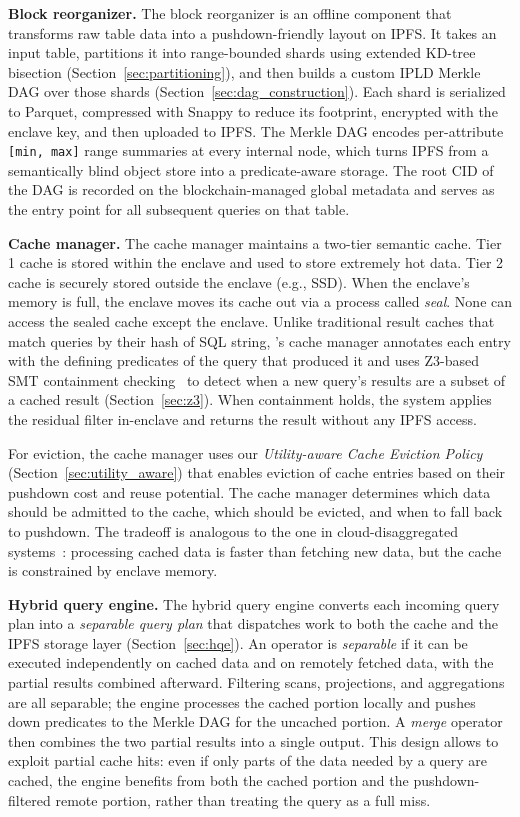 \textbf{Block reorganizer.}
The block reorganizer is an offline component that transforms raw table data into a pushdown-friendly layout on IPFS. It takes an input table, partitions it into range-bounded shards using extended KD-tree bisection (Section~\ref{sec:partitioning}), and then builds a custom IPLD Merkle DAG over those shards (Section~\ref{sec:dag_construction}). Each shard is serialized to Parquet, compressed with Snappy to reduce its footprint, encrypted with the enclave key, and then uploaded to IPFS. The Merkle DAG encodes per-attribute \texttt{[min, max]} range summaries at every internal node, which turns IPFS from a semantically blind object store into a predicate-aware storage. The root CID of the DAG is recorded on the blockchain-managed global metadata and serves as the entry point for all subsequent queries on that table.
 
\textbf{Cache manager.}
The cache manager maintains a two-tier semantic cache. Tier 1 cache is stored within the enclave and used to store extremely hot data. Tier 2 cache is securely stored outside the enclave (e.g., SSD). When the enclave's memory is full, the enclave moves its cache out via a process called \textit{seal}. None can access the sealed cache except the enclave. Unlike traditional result caches that match queries by their hash of SQL string, \ours{}'s cache manager annotates each entry with the defining predicates of the query that produced it and uses Z3-based SMT containment checking~\cite{de2008z3} to detect when a new query's results are a subset of a cached result (Section~\ref{sec:z3}). When containment holds, the system applies the residual filter in-enclave and returns the result without any IPFS access. 

For eviction, the cache manager uses our \emph{Utility-aware Cache Eviction Policy} (Section~\ref{sec:utility_aware}) that enables eviction of cache entries based on their pushdown cost and reuse potential. The cache manager determines which data should be admitted to the cache, which should be evicted, and when to fall back to pushdown. The tradeoff is analogous to the one in cloud-disaggregated systems~\cite{yang2021flexpushdowndb}: processing cached data is faster than fetching new data, but the cache is constrained by enclave memory.
 
\textbf{Hybrid query engine.}
The hybrid query engine converts each incoming query plan into a \emph{separable query plan} that dispatches work to both the cache and the IPFS storage layer (Section~\ref{sec:hqe}). An operator is \emph{separable} if it can be executed independently on cached data and on remotely fetched data, with the partial results combined afterward. Filtering scans, projections, and aggregations are all separable; the engine processes the cached portion locally and pushes down predicates to the Merkle DAG for the uncached portion. A \emph{merge} operator then combines the two partial results into a single output. This design allows \ours{} to exploit partial cache hits: even if only parts of the data needed by a query are cached, the engine benefits from both the cached portion and the pushdown-filtered remote portion, rather than treating the query as a full miss.


